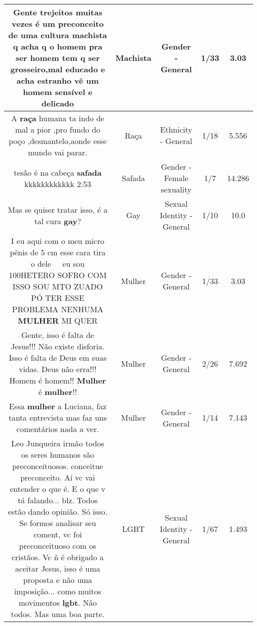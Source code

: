 \documentclass[11pt]{article}
\newlength\mylength
\begin{document}
\begin{center}
\begin{longtable}{|C{.65\mylength}|C{.30\mylength}|C{.12\mylength}|C{.12\mylength}|C{.12\mylength}|}
  \small Gente trejeitos muitas vezes  é um preconceito de uma cultura \textbf{machista} q acha q o homem pra ser homem tem q ser grosseiro,mal educado e acha estranho vê um homem sensível e delicado\normalsize   & Machista & Gender - General & 1/33 & 3.03 \\  \hline
  \small A \textbf{raça} humana ta indo de mal a pior ,pro fundo do poço ,desmantelo,aonde esse mundo vai parar.\normalsize   & Raça & Ethnicity - General & 1/18 & 5.556 \\  \hline
  \small tesão é na cabeça \textbf{safada} kkkkkkkkkkkk 2:53\normalsize   & Safada & Gender - Female sexuality & 1/7 & 14.286 \\  \hline
  \small Mas se quiser tratar isso, é a tal cura \textbf{gay}?\normalsize   & Gay & Sexual Identity - General & 1/10 & 10.0 \\  \hline
  \small I eu aqui com o meu micro pênis de 5 cm  esse cara tira o dele 😤😤😤😤eu sou 100HETERO SOFRO COM ISSO SOU MTO ZUADO PÓ TER ESSE PROBLEMA NENHUMA \textbf{MULHER} MI QUER\normalsize   & Mulher & Gender - General & 1/33 & 3.03 \\  \hline
  \small Gente, isso é falta de Jesus!!! Não existe disforia. Isso é falta de Deus em suas vidas. Deus não erra!!! Homem é homem!! \textbf{Mulher} é \textbf{mulher}!!\normalsize   & Mulher & Gender - General & 2/26 & 7.692 \\  \hline
  \small Essa \textbf{mulher} a Luciana, faz tanta entrevista mas faz uns comentários nada a ver.\normalsize   & Mulher & Gender - General & 1/14 & 7.143 \\  \hline
  \small Leo Junqueira irmão todos os seres humanos são preconceituosos. conceitue preconceito. Aí vc vai entender o que é.  E o que v tá falando... blz. Todos estão dando opinião.  Só isso. Se formos analisar seu coment, vc foi preconceituoso com os cristãos.  Vc ñ é obrigado a aceitar Jesus, isso é uma proposta e não uma imposição... como muitos movimentos \textbf{lgbt}. Não todos. Mas uma boa parte.\normalsize   & LGBT & Sexual Identity - General & 1/67 & 1.493 \\  \hline

\end{longtable}
\end{center}
\end{document}
